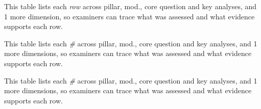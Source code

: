 \tablefontsize


\noindent This table lists each \textit{row} across pillar, mod., core question and key analyses, and 1 more dimension, so examiners can trace what was assessed and what evidence supports each row.



\noindent This table lists each \textit{\#} across pillar, mod., core question and key analyses, and 1 more dimensions, so examiners can trace what was assessed and what evidence supports each row.


\noindent This table lists each \textit{\#} across pillar, mod., core question and key analyses, and 1 more dimensions, so examiners can trace what was assessed and what evidence supports each row.



